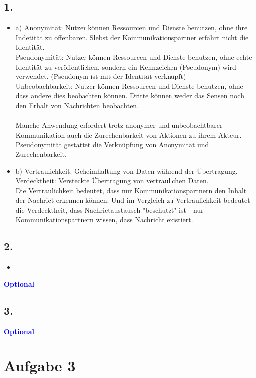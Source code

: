 \documentclass[a4paper,11pt]{scrartcl}
\newcommand{\opt}{\textcolor{blue}{\textbf{Optional}}}
\begin{document}
\subsection*{1.}
\begin{itemize}
\item{a)} 
Anonymität: Nutzer können Ressourcen und Dienste benutzen, ohne ihre 
Indetität zu offenbaren. Slebst der Kommunikationspartner erfährt nicht die Identität.\\
Pseudonymität: Nutzer können Ressourcen und Dienste benutzen, ohne echte Identität zu veröffentlichen, sondern ein Kennzeichen (Pseudonym) wird verwendet. (Pseudonym ist mit der Identität verknüpft) \\
Unbeobachbarkeit: Nutzer können Ressourcen und Dienste benutzen, ohne dass andere dies beobachten können. Dritte können weder das Sensen noch den Erhalt von Nachrichten beobachten.\\
\\
Manche Anwendung erfordert trotz anonymer und unbeobachtbarer Kommunikation auch
die Zurechenbarkeit von Aktionen zu ihrem Akteur. Pseudonymität
gestattet die Verknüpfung von Anonymität und Zurechenbarkeit.
\\
\item{b)} Vertraulichkeit: Geheimhaltung von Daten während der Übertragung. \\
Verdecktheit: Versteckte Übertragung von vertraulichen Daten. \\
Die Vertraulichkeit bedeutet, dass nur Kommunikationspartnern den Inhalt der Nachrict erkennen können. Und im Vergleich zu Vertraulichkeit bedeutet  die Verdecktheit, dass Nachrictaustausch "beschutzt" ist - nur Kommunikationspartnern wissen, dass Nachricht existiert.


\end{itemize}

\subsection*{2.}
\begin{itemize}
\item 

\end{itemize}
\opt
\subsection*{3.}
\opt
 
\section*{Aufgabe 3}
\end{document}
